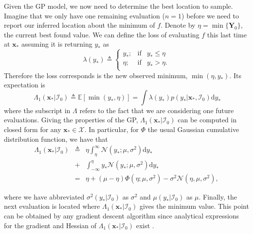 \documentclass[twoside]{article}
\newcommand{\I}{\mathcal{I}}
\newcommand{\ud}{\mathrm{d}}
\newcommand{\E}{\mathbb{E}}
\newcommand{\bx}{\textbf{x}}
\newcommand{\bY}{\textbf{Y}}
\begin{document}
Given the GP model, we now need to determine the best location to sample. Imagine that we only have one remaining evaluation ($n=1$) before we need to report our inferred location about the minimum of $f$. Denote by $\eta = \min \{\bY_0\}$, the current best found value. We can define the loss of evaluating $f$ this last time at $\bx_*$ assuming it is returning $y_*$ as
$$\lambda(y_*)\triangleq \left\{ \begin{array}{lcl}
y_*;             & \mbox{if}  &  y_* \leq \eta \\
 \eta; & \mbox{if}  & y_* > \eta. \\
\end{array}
\right.$$
Therefore the loss corresponds is the new observed minimum, $\min (\eta,y_*)$. Its expectation is 
$$\ \Lambda_1(\bx_*| \I_0) \triangleq \E[ \min (y_*,\eta)]= \int \lambda(y_*)p(y_* |\bx_*,\I_0)\ud y_*$$
where the subscript in $\Lambda$ refers to the fact that we are considering one future evaluations.  Giving the properties of the GP, $\Lambda_1(\bx_*| \I_0)$ can be computed in closed form for any $\bx_* \in \mathcal{X}$. In particular, for $\Phi$ the usual Gaussian cumulative distribution function, we have that
\begin{eqnarray}\label{eq:expected_myopic_loss}
\Lambda_1(\bx_*| \I_0) &  \triangleq & \eta \int_{\eta}^{\infty} \mathcal{N}(y_*;\mu,\sigma^2) \ud y_* \\ \nonumber
& +  & \int_{-\infty}^{\eta} y_* \mathcal{N}(y_*;\mu,\sigma^2) \ud y_*  \\ \nonumber
& = &  \eta +(\mu  - \eta) \Phi (\eta ; \mu, \sigma^2) - \sigma^2 \mathcal{N} (\eta, \mu, \sigma^2), \nonumber
\end{eqnarray}

where we have abbreviated $\sigma^2(y_*|\I_0)$ as $\sigma^2$ and $\mu(y_{*}|\I_0)$ as $\mu$. Finally, the next evaluation is located   where $\Lambda_1(\bx_*| \I_0) $ gives the minimum value. This point can  be obtained by any gradient descent algorithm since analytical expressions for the gradient and Hessian of $\Lambda_1(\bx_*| \I_0)$  exist \citep{osborne_bayesian_2010}. 




\end{document}
